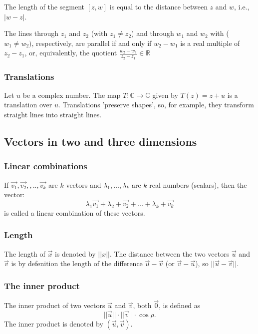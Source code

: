\documentclass{article}
\begin{document}
			The length of the segment $[z,w]$ is equal to the distance between $z$ and $w$, i.e., $|w-z|$.
			
			The lines through $z_1$ and $z_2$ (with $z_1 \neq z_2$) and through $w_1$ and $w_2$ with ($w_1 \neq w_2)$, respectively, are parallel if and only if $w_2 - w_1$ is a real multiple of $z_2-z_1$, or, equivalently, the quotient $\frac{w_2-w_1}{z_2-z_1} \in \mathbb{R}$
			
			\subsubsection{Translations}
			Let $u$ be a complex number. The map $T: \mathbb{C} \to \mathbb{C}$ given by $T(z) = z+u$ is a translation over $u$. Translations 'preserve shapes', so, for example, they transform straight lines into straight lines.

		\subsection{Vectors in two and three dimensions}
			\subsubsection{Linear combinations}
			If $\vec{v_1},\vec{v_2},,..,\vec{v_k}$ are $k$ vectors and $\lambda_1,\dots,\lambda_k$ are $k$ real numbers (scalars), then the vector:
			\begin{equation*}
				\lambda_1\vec{v_1} + \lambda_2+\vec{v_2} + \dots + \lambda_k+\vec{v_k}
			\end{equation*}
			is called a linear combination of these vectors.
			
			\subsubsection{Length}
			The length of $\vec{x}$ is denoted by $||x||$. The distance between the two vectors $\vec{u}$ and $\vec{v}$ is by defenition the length of the difference $\vec{u}- \vec{v}$ (or $\vec{v} - \vec{u}$), so $||\vec{u} - \vec{v}||$.
			
			\subsubsection{The inner product}
			The inner product of two vectors $\vec{u}$ and $\vec{v}$, both $\vec{0}$, is defined as
			\begin{equation*}
				||\vec{u}|| \cdot ||\vec{v}|| \cdot \cos{\rho}.
			\end{equation*}
			The inner product is denoted by $(\vec{u}, \vec{v})$.
			
\end{document}
